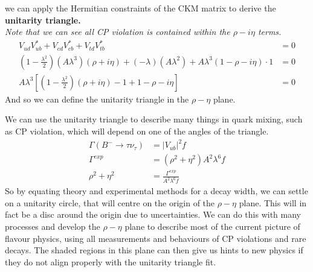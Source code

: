 \documentclass[a4paper, 11pt, normalem]{article}
\begin{document}
we can apply the Hermitian constraints of the CKM matrix to derive the \textbf{unitarity triangle.}\\
\textit{Note that we can see all CP violation is contained within the $\rho-i\eta$ terms.}
\begin{align}
    V_{ud}V_{ub}^* + V_{cd}V_{cb}^* + V_{td}V_{tb}^* &= 0  \\
    \left(1-\frac{\lambda^2}{2}\right)(A\lambda^3)(\rho+i\eta) + (-\lambda)(A\lambda^2) + A\lambda^3(1-\rho-i\eta)\cdot1 &= 0 \\
    A\lambda^3\left[\left(1-\frac{\lambda^2}{2}\right)(\rho+i\eta) - 1 + 1 - \rho-i\eta\right] &= 0
\end{align}
And so we can define the unitarity triangle in the $\rho-\eta$ plane.
\begin{figure}[H]
    \centering
\end{figure}
We can use the unitarity triangle to describe many things in quark mixing, such as CP violation, which will depend on one of the angles of the triangle. 
\begin{align}
    \Gamma(B^-\to\tau\nu_\tau) &= |V_{ub}|^2f \\
    \Gamma^{exp} &= (\rho^2+\eta^2)A^2\lambda^6 f \\
    \rho^2+\eta^2 &= \frac{\Gamma^{exp}}{A^2\lambda^6f}
\end{align}
So by equating theory and experimental methods for a decay width, we can settle on a unitarity circle, that will centre on the origin of the $\rho-\eta$ plane. 
This will in fact be a disc around the origin due to uncertainties. 
We can do this with many processes and develop the $\rho-\eta$ plane to describe most of the current picture of flavour physics, using all measurements and behaviours of CP violations and rare decays.
The shaded regions in this plane can then give us hints to new physics if they do not align properly with the unitarity triangle fit. 
\end{document}
